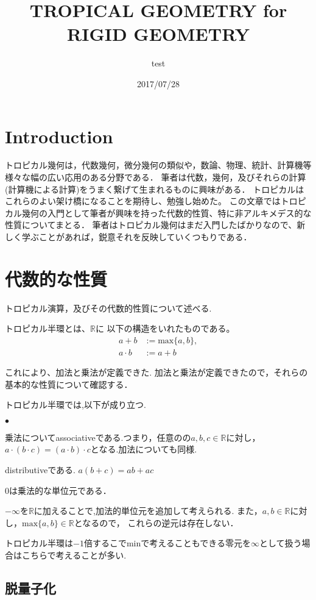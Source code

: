 \documentclass{ujarticle}
\title{TROPICAL GEOMETRY for RIGID GEOMETRY}
\author{test}
\date{2017/07/28}
\renewenvironment{itemize}%
{%
   \begin{list}{\parbox{1zw}{$\bullet$}}%
   {%
      \setlength{\topsep}{0zh}
      \setlength{\itemindent}{0zw}
      \setlength{\leftmargin}{2zw}%
      \setlength{\rightmargin}{0zw}%
      \setlength{\labelsep}{1zw}%
      \setlength{\labelwidth}{3zw}%
      \setlength{\itemsep}{0em}%
      \setlength{\parsep}{0em}%
      \setlength{\listparindent}{0zw}%
   }
}{%
   \end{list}%
}
\begin{document}
\section{Introduction}
\label{sec:Introduction}
トロピカル幾何は，代数幾何，微分幾何の類似や，数論、物理、統計、計算機等様々な幅の広い応用のある分野である．
筆者は代数，幾何，及びそれらの計算(計算機による計算)をうまく繋げて生まれるものに興味がある．
トロピカルはこれらのよい架け橋になることを期待し、勉強し始めた。
この文章ではトロピカル幾何の入門として筆者が興味を持った代数的性質、特に非アルキメデス的な性質についてまとる．
筆者はトロピカル幾何はまだ入門したばかりなので、新しく学ぶことがあれば，鋭意それを反映していくつもりである．


\section{代数的な性質}
\label{sec:代数的な性質}
トロピカル演算，及びその代数的性質について述べる.
\begin{dfn}
 トロピカル半環とは、$\mathbb{R}$に 以下の構造をいれたものである。
\begin{align*}
  a + b &:= \mathrm{max}\{a,b\}, \\
  a \cdot b &:= a + b
\end{align*}
\end{dfn}

これにより、加法と乗法が定義できた.
加法と乗法が定義できたので，それらの基本的な性質について確認する．
\begin{lem}
トロピカル半環では,以下が成り立つ.
\begin{itemize}
  \item 乗法についてassociativeである.つまり，任意のの$a,b,c \in \mathbb{R}$に対し，$a \cdot (b \cdot c) = (a \cdot b ) \cdot c$となる.加法についても同様.
  \item distributiveである. $a(b + c) = ab +  ac$
  \item $0$は乗法的な単位元である．
\end{itemize}
\end{lem}
$- \infty$を$\mathbb{R}$に加えることで,加法的単位元を追加して考えられる.
また，$a,b\in \mathbb{R}$に対し，$ \mathrm{max}\{ a,b\} \in \mathbb{R}$となるので，
これらの逆元は存在しない．
\begin{rem}
 トロピカル半環は$-1$倍するこでminで考えることもできる零元を$\infty$として扱う場合はこちらで考えることが多い.
\end{rem}
\subsection{脱量子化}
\label{sub:脱量子化}
\end{document}
